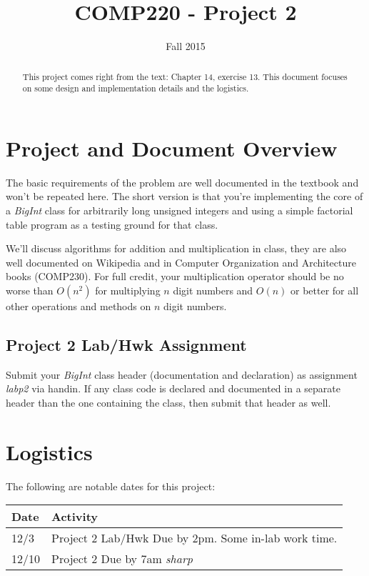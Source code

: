\documentclass[10pt]{article}
\title{COMP220 - Project 2}
\author{ }
\date{Fall 2015}
\begin{document}
\maketitle
\thispagestyle{empty}

\begin{abstract}
This project comes right from the text: Chapter 14, exercise 13. This document focuses on some design and implementation details and the logistics. 
\end{abstract}

\section{Project and Document Overview}

The basic requirements of the problem are well documented in the textbook and won't be repeated here. The short version is that you're implementing the core of a \textit{BigInt} class for arbitrarily long unsigned integers and using a simple factorial table program as a testing ground for that class. 

We'll discuss algorithms for addition and multiplication in class, they are also well documented on Wikipedia and in Computer Organization and Architecture books (COMP230). For full credit, your multiplication operator should be no worse than $O(n^2)$ for multiplying $n$ digit numbers and $O(n)$ or better for all other operations and methods on $n$ digit numbers.   

\subsection{Project 2 Lab/Hwk Assignment}

Submit your \textit{BigInt} class header (documentation and declaration) as assignment \textit{labp2} via handin. If any class code is declared and documented in a separate header than the one containing the class, then submit that header as well.  

\section{Logistics}

The following are notable dates for this project:
\begin{center}
\begin{tabular}{ll}
Date & Activity \\ \hline
12/3 & Project 2 Lab/Hwk Due by 2pm. Some in-lab work time. \\
12/10 & Project 2 Due by 7am \textit{sharp}
\end{tabular}
\end{center}
\end{document}
